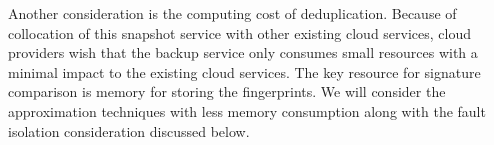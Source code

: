 Another consideration is the computing cost of deduplication.
Because of collocation of this snapshot service with other existing cloud services, 
cloud providers wish that the backup service only consumes  small resources
with a minimal impact to the existing cloud services.
The key resource for signature comparison  is memory for storing the fingerprints. 
We will consider the approximation techniques with less memory consumption along 
with the fault isolation consideration discussed below. 



